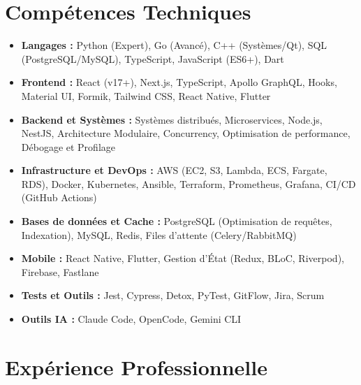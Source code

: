 \documentclass[a4paper,10pt]{article}
\begin{document}
\section*{Compétences Techniques}
\begin{itemize}[leftmargin=*,nosep]
    \item \textbf{Langages :} Python (Expert), Go (Avancé), C++ (Systèmes/Qt), SQL (PostgreSQL/MySQL), TypeScript, JavaScript (ES6+), Dart
    \item \textbf{Frontend :} React (v17+), Next.js, TypeScript, Apollo GraphQL, Hooks, Material UI, Formik, Tailwind CSS, React Native, Flutter
    \item \textbf{Backend et Systèmes :} Systèmes distribués, Microservices, Node.js, NestJS, Architecture Modulaire, Concurrency, Optimisation de performance, Débogage et Profilage
    \item \textbf{Infrastructure et DevOps :} AWS (EC2, S3, Lambda, ECS, Fargate, RDS), Docker, Kubernetes, Ansible, Terraform, Prometheus, Grafana, CI/CD (GitHub Actions)
    \item \textbf{Bases de données et Cache :} PostgreSQL (Optimisation de requêtes, Indexation), MySQL, Redis, Files d'attente (Celery/RabbitMQ)
    \item \textbf{Mobile :} React Native, Flutter, Gestion d'État (Redux, BLoC, Riverpod), Firebase, Fastlane
    \item \textbf{Tests et Outils :} Jest, Cypress, Detox, PyTest, GitFlow, Jira, Scrum
    \item \textbf{Outils IA :} Claude Code, OpenCode, Gemini CLI
\end{itemize}

\section*{Expérience Professionnelle}
\end{document}
